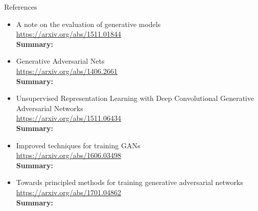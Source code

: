 \documentclass{beamer}
\begin{document}
\begin{frame}{References}
{\tiny
\begin{itemize}
	\item A note on the evaluation of generative models \\
	\href{https://arxiv.org/abs/1511.01844}{https://arxiv.org/abs/1511.01844} \\
	\textbf{Summary:} 
	
	\item Generative Adversarial Nets \\
	\href{https://arxiv.org/abs/1406.2661}{https://arxiv.org/abs/1406.2661} \\
	\textbf{Summary:} 
	
	\item Unsupervised Representation Learning with Deep Convolutional Generative Adversarial Networks \\
	\href{https://arxiv.org/abs/1511.06434}{https://arxiv.org/abs/1511.06434} \\
	\textbf{Summary:} 
	
	\item Improved techniques for training GANs \\
	\href{https://arxiv.org/abs/1606.03498}{https://arxiv.org/abs/1606.03498} \\
	\textbf{Summary:} 
	
	\item Towards principled methods for training generative adversarial networks \\
	\href{https://arxiv.org/abs/1701.04862}{https://arxiv.org/abs/1701.04862} \\
	\textbf{Summary:} 
\end{itemize}
}
\end{frame}
\end{document}
